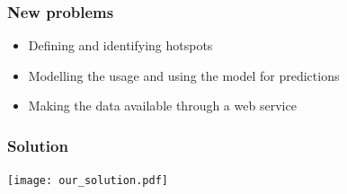\begin{frame}
\frametitle{New problems}
\begin{itemize}
\item Defining and identifying hotspots
\item Modelling the usage and using the model for predictions
\item Making the data available through a web service
\end{itemize}
\end{frame}

\begin{frame}
\frametitle{Solution}

\centering
\texttt{[image: our\_solution.pdf]}

\end{frame}
